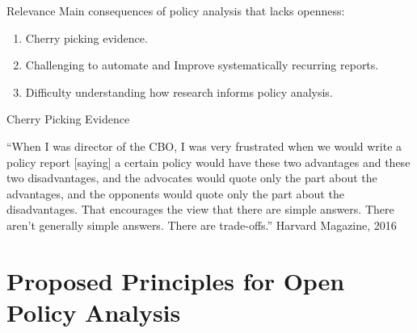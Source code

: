 \documentclass{beamer}
\begin{document}
\begin{frame}{Relevance}
Main consequences of policy analysis that lacks openness:
\begin{enumerate}
\item Cherry picking evidence.
\item Challenging to automate and Improve systematically recurring reports.
\item Difficulty understanding how research informs policy analysis.
\end{enumerate}
\end{frame}

\begin{frame}{Cherry Picking Evidence}
\pause
\begin{exampleblock}{}
  {\large ``When I was director of the CBO, I was very frustrated when we would write a policy report [saying] a certain policy would have these two advantages and these two disadvantages, and the advocates would quote only the part about the advantages, and the opponents would quote only the part about the disadvantages. That encourages the view that there are simple answers. There aren't generally simple answers. There are trade-offs.''
}
  \vskip3mm
   \footnotesize{ \linebreak  Harvard Magazine, 2016} 
  	  
\end{exampleblock}
\end{frame} 





\section[Open PA]{Proposed Principles for Open Policy Analysis}
\end{document}
